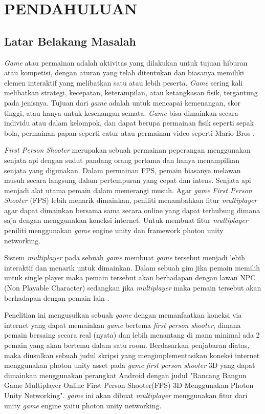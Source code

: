 \chapter{PENDAHULUAN}
\section{Latar Belakang Masalah}
\noindent

\textit{Game} atau permainan adalah aktivitas yang dilakukan untuk tujuan hiburan atau kompetisi, dengan aturan yang telah ditentukan dan biasanya memiliki elemen interaktif yang melibatkan satu atau lebih peserta. \textit{Game} sering kali melibatkan strategi, kecepatan, keterampilan, atau ketangkasan fisik, tergantung pada jenisnya. Tujuan dari \textit{game} adalah untuk mencapai kemenangan, skor tinggi, atau hanya untuk kesenangan semata. \textit{Game} bisa dimainkan secara individu atau dalam kelompok, dan dapat berupa permainan fisik seperti sepak bola, permainan papan seperti catur atau permainan video seperti Mario Bros \parencite{fps}.

\textit{First Person Shooter} merupakan sebuah permainan peperangan menggunakan senjata api dengan sudut pandang orang pertama dan hanya menampilkan senjata yang digunakan.
Dalam permainan FPS, pemain biasanya melawan musuh secara langsung dalam pertempuran yang cepat dan intens\parencite{fps}. Senjata api menjadi alat utama pemain dalam memerangi musuh.
Agar \textit{game} \textit{First Person Shooter} (FPS) lebih menarik dimainkan, peniliti menambahkan fitur \textit{multiplayer} agar dapat dimainkan bersama sama secara online yang dapat terhubung dimana saja dengan menggunakan koneksi internet. Untuk membuat fitur \textit{multiplayer} peniliti menggunakan \textit{game} engine unity dan framework photon unity networking.

Sistem \textit{multiplayer} pada sebuah \textit{\textit{game}} membuat \textit{\textit{game}} tersebut menjadi lebih interaktif dan menarik untuk dimainkan. Dalam sebuah gim jika pemain memilih untuk single player maka pemain tersebut akan berhadapan dengan lawan NPC (Non Playable Character) sedangkan jika \textit{multiplayer} maka pemain tersebut akan berhadapan dengan pemain lain \parencite{Sarwodi}.


Penelitian ini mengusulkan sebuah \textit{\textit{game}} dengan memanfaatkan koneksi via internet yang dapat memainkan \textit{\textit{game}} bertema \textit{first person shooter}, dimana pemain bersaing secara real (nyata) dan lebih menantang di mana minimal ada 2 pemain yang akan bertemu dalam satu room.
Berdasarkan penjabaran diatas, maka diusulkan sebuah judul skripsi yang mengimplementasikan koneksi internet menggunakan photon unity asset pada \textit{\textit{game}} \textit{first person shooter} 3D yang dapat dimainkan menggunakan perangkat Android dengan judul "Rancang Bangun Game Multiplayer Online First Person Shooter(FPS) 3D Menggunakan Photon Unity Networking".
\textit{\textit{game}} ini akan dibuat \textit{multiplayer} menggunakan fitur dari unity \textit{\textit{game}} engine yaitu photon unity networking.

